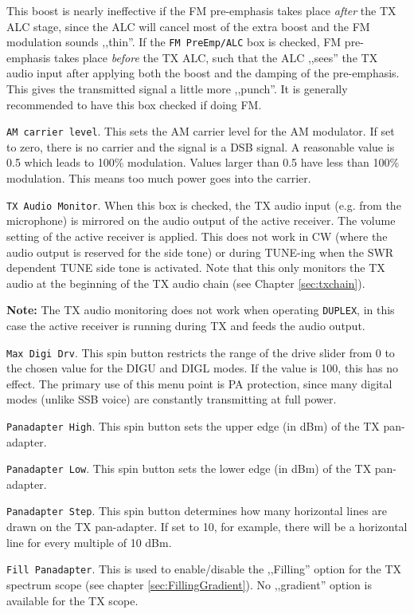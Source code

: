 \documentclass[12pt]{book}
\def\rett#1{\texttt{\color{red}#1}}
\def\bltt#1{\texttt{\color{blue}#1}}
\begin{document}
This boost is nearly ineffective if the FM pre-emphasis takes place \textit{after}
the TX ALC stage, since the ALC will cancel most of the extra boost and the FM
modulation sounds ,,thin''. If the \rett{FM PreEmp/ALC} box is checked, FM
pre-emphasis takes place \textit{before} the TX ALC, such that the ALC ,,sees''
the TX audio input after applying both the boost and the damping of the pre-emphasis. This gives the
transmitted signal a little more ,,punch''. It is generally recommended to have this box checked
if doing FM.

\rett{AM carrier level}. This sets the AM carrier level for the AM modulator. If set to zero, there is no
carrier and the
signal is a DSB signal. A reasonable value is 0.5 which leads to 100\% modulation. Values larger than
0.5 have less than 100\% modulation. This means too much power goes into the carrier.

\rett{TX Audio Monitor}. When this box is checked, the TX audio input (e.g. from the microphone)
is mirrored on the audio output
of the active receiver. The volume setting of the active receiver is applied. This does not work
in CW (where the audio output is reserved for the side tone) or during TUNE-ing when the SWR dependent
TUNE side tone is activated. Note that this only monitors the TX audio at the beginning of the
TX audio chain (see Chapter \ref{sec:txchain}).

\textbf{Note:} The TX audio monitoring does not work when operating \bltt{DUPLEX}, in this case the
active receiver is running during TX and feeds the audio output.

\rett{Max Digi Drv}. This spin button restricts the range of the drive slider from 0 to the
chosen value
for the DIGU and DIGL modes. If the value is 100, this has no effect. The primary use of this menu point is
PA protection,
since many digital modes (unlike SSB voice) are constantly transmitting at full power.

\rett{Panadapter High}. This spin button sets the upper edge (in dBm) of the TX pan-adapter.

\rett{Panadapter Low}. This spin button sets the lower edge (in dBm) of the TX pan-adapter.

\rett{Panadapter Step}. This spin button determines how many horizontal lines are drawn on the
TX pan-adapter. If set to 10, for example, there will be a horizontal line for every multiple
of 10 dBm.

\rett{Fill Panadapter}. This is used to enable/disable the ,,Filling'' option
for the TX  spectrum scope (see chapter \ref{sec:FillingGradient}). No ,,gradient''
option is available for the TX scope.
\end{document}
